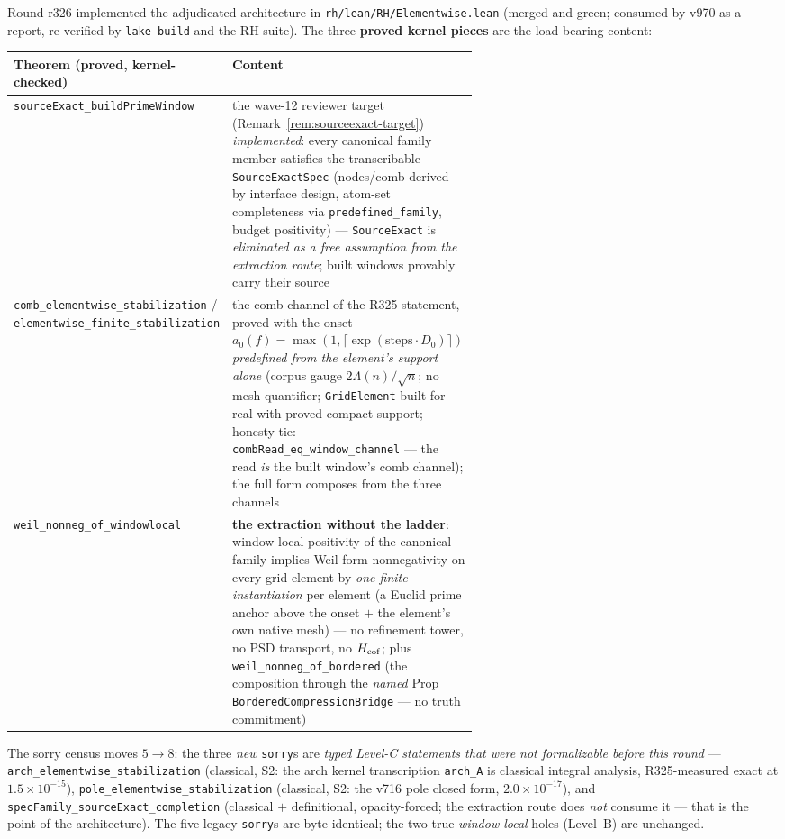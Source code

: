 \documentclass[11pt]{article}
\theoremstyle{definition}
\theoremstyle{remark}
\begin{document}
Round r326 implemented the adjudicated architecture in
\texttt{rh/lean/RH/Elementwise.lean} (merged and green; consumed by
v970 as a report, re-verified by \texttt{lake build} and the RH
suite).  The three \textbf{proved kernel pieces} are the load-bearing
content:

\begin{center}\small
\begin{tabular}{@{}lp{0.60\linewidth}@{}}
\toprule
\textbf{Theorem (proved, kernel-checked)} & \textbf{Content}\\
\midrule
\texttt{sourceExact\_buildPrimeWindow} & the wave-12 reviewer target
(Remark~\ref{rem:sourceexact-target}) \emph{implemented}: every
canonical family member satisfies the transcribable
\texttt{SourceExactSpec} (nodes/comb derived by interface design,
atom-set completeness via \texttt{predefined\_family}, budget
positivity) --- \texttt{SourceExact} is \emph{eliminated as a free
assumption from the extraction route}; built windows provably carry
their source\\
\texttt{comb\_elementwise\_stabilization} /
\texttt{elementwise\_finite\_stabilization} & the comb channel of
the R325 statement, proved with the onset
$a_0(f) = \max(1, \lceil \exp(\mathrm{steps}\cdot D_0)\rceil)$
\emph{predefined from the element's support alone} (corpus gauge
$2\Lambda(n)/\sqrt n$; no mesh quantifier; \texttt{GridElement}
built for real with proved compact support; honesty tie:
\texttt{combRead\_eq\_window\_channel} --- the read \emph{is} the
built window's comb channel); the full form composes from the three
channels\\
\texttt{weil\_nonneg\_of\_windowlocal} & \textbf{the extraction
without the ladder}: window-local positivity of the canonical
family implies Weil-form nonnegativity on every grid element by
\emph{one finite instantiation} per element (a Euclid prime anchor
above the onset $+$ the element's own native mesh) --- no refinement
tower, no PSD transport, no $H_{\rm cof}$; plus
\texttt{weil\_nonneg\_of\_bordered} (the composition through the
\emph{named} Prop \texttt{BorderedCompressionBridge} --- no truth
commitment)\\
\bottomrule
\end{tabular}
\end{center}

\noindent The sorry census moves $5 \to 8$: the three \emph{new}
\texttt{sorry}s are \emph{typed Level-C statements that were not
formalizable before this round} ---
\texttt{arch\_elementwise\_stabilization} (classical, S2: the arch
kernel transcription \texttt{arch\_A} is classical integral
analysis, R325-measured exact at $1.5\times10^{-15}$),
\texttt{pole\_elementwise\_stabilization} (classical, S2: the v716
pole closed form, $2.0\times10^{-17}$), and
\texttt{specFamily\_sourceExact\_completion} (classical $+$
definitional, opacity-forced; the extraction route does \emph{not}
consume it --- that is the point of the architecture).  The five
legacy \texttt{sorry}s are byte-identical; the two true
\emph{window-local} holes (Level~B) are unchanged.
\end{document}
